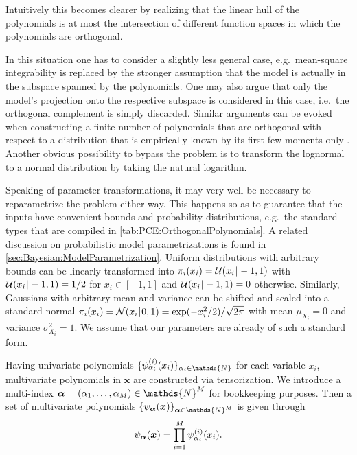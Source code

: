 Intuitively this becomes clearer by realizing that the linear hull of the polynomials is at most the intersection of different function spaces in which the polynomials are orthogonal.
\par %
In this situation one has to consider a slightly less general case,
e.g.\ mean-square integrability is replaced by the stronger assumption that the model is actually in the subspace spanned by the polynomials.
One may also argue that only the model's projection onto the respective subspace is considered in this case, i.e.\ the orthogonal complement is simply discarded.
Similar arguments can be evoked when constructing a finite number of polynomials that are orthogonal with respect to a distribution
that is empirically known by its first few moments only \cite{PCE:Witteveen2006:Proc,PCE:Oladyshkin2012,PCE:Ahlfeld2016}.
Another obvious possibility to bypass the problem is to transform the lognormal to a normal distribution by taking the natural logarithm.
\par %
Speaking of parameter transformations, it may very well be necessary to reparametrize the problem either way.
This happens so as to guarantee that the inputs have convenient bounds and probability distributions, e.g.\ the standard types that are compiled in \cref{tab:PCE:OrthogonalPolynomials}.
A related discussion on probabilistic model parametrizations is found in \cref{sec:Bayesian:ModelParametrization}.
Uniform distributions with arbitrary bounds can be linearly transformed into \(\pi_i(x_i) = \mathcal{U}(x_i {\:\!}|{\:\!} -1,1)\)
with \(\mathcal{U}(x_i {\:\!}|{\:\!} -1,1) = 1/2\) for \(x_i \in [-1,1]\) and \(\mathcal{U}(x_i {\:\!}|{\:\!} -1,1) = 0\) otherwise.
Similarly, Gaussians with arbitrary mean and variance can be shifted and scaled into a standard normal \(\pi_i(x_i) = \mathcal{N}(x_i {\:\!}|{\:\!} 0,1) = \exp(-x_i^2/2) / \sqrt{2\pi}\)
with mean \(\mu_{X_i} = 0\) and variance \(\sigma_{X_i}^2 = 1\).
We assume that our parameters are already of such a standard form.
\par %
Having univariate polynomials \(\{\basisU_{\alpha_i}^{(i)}(x_i)\}_{\alpha_i \in \mathds{N}}\) for each variable \(x_i\), multivariate polynomials in \(\bm{x}\) are constructed via tensorization.
We introduce a multi-index \(\bm{\alpha} = (\alpha_1,\ldots,\alpha_\dimParam) \in \mathds{N}^\dimParam\) for bookkeeping purposes.
Then a set of multivariate polynomials \(\{\basisU_{\bm{\alpha}}(\bm{x})\}_{\bm{\alpha} \in \mathds{N}^\dimParam}\) is given through
\begin{equation} \label{eq:PCE:MultivariatePolynomial}
  \psi_{\bm{\alpha}}(\bm{x}) = \prod\limits_{i=1}^M \psi^{(i)}_{\alpha_i}(x_i).
\end{equation}
